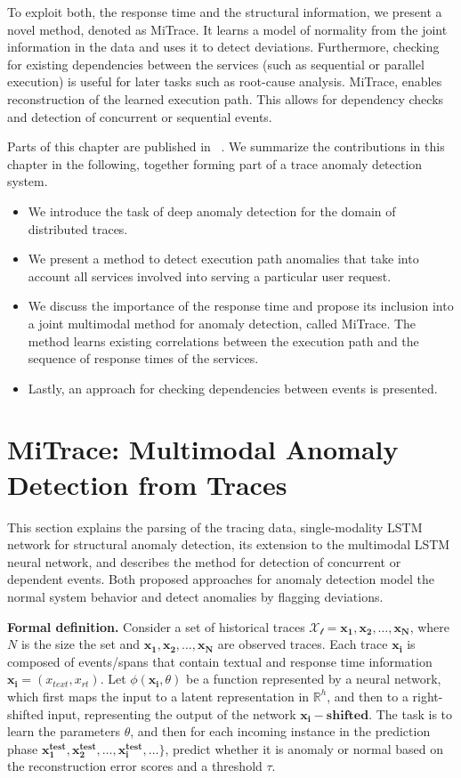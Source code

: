 To exploit both, the response time and the structural information, we present a novel method, denoted as MiTrace. It learns a model of normality from the joint information in the data and uses it to detect deviations. Furthermore, checking for existing dependencies between the services (such as sequential or parallel execution) is useful for later tasks such as root-cause analysis. MiTrace, enables reconstruction of the learned execution path. This allows for dependency checks and detection of concurrent or sequential events.


Parts of this chapter are published in ~\cite{nedelkoski2019anomalymultimodal,nedelkoski2020data,nedelkoski2019anomaly,nedelkoski2020selftracing}. We summarize the contributions in this chapter in the following, together forming part of a trace anomaly detection system. 
\begin{itemize}
    \item We introduce the task of deep anomaly detection for the domain of distributed traces.
    \item We present a method to detect execution path anomalies that take into account all services involved into serving a particular user request.
    \item We discuss the importance of the response time and propose its inclusion into a joint multimodal method for anomaly detection, called MiTrace. The method learns existing correlations between the execution path and the sequence of response times of the services. 
    \item Lastly, an approach for checking dependencies between events is presented.
\end{itemize}


\section{MiTrace: Multimodal Anomaly Detection from Traces}\label{methodology}
This section explains the parsing of the tracing data, single-modality LSTM network for structural anomaly detection, its extension to the multimodal LSTM neural network, and describes the method for detection of concurrent or dependent events. Both proposed approaches for anomaly detection model the normal system behavior and detect anomalies by flagging deviations.

\textbf{Formal definition.} Consider a set of historical traces $\mathcal{X_t} = \mathbf{x_{1}}, \mathbf{x_{2}}, \dots, \mathbf{x_{N}}$, where $N$ is the size the set and $\mathbf{x_{1}}, \mathbf{x_{2}}, \dots, \mathbf{x_{N}}$ are observed traces. Each trace $\mathbf{x_{i}}$ is composed of events/spans that contain textual and response time information $\mathbf{x_{i}}= (x_{text}, x_{rt})$. Let $\phi(\mathbf{x_i}, \theta)$ be a function represented by a neural network, which first maps the input to a latent representation in $\mathbb{R}^h$, and then to a right-shifted input, representing the output of the network $\mathbf{x_{i}-shifted}$. The task is to learn the parameters $\theta$, and then for each incoming instance in the prediction phase $\mathbf{x_1^{test}}, \mathbf{x_2^{test}},\dots, \mathbf{x_i^{test}}, \dots\}$, predict whether it is anomaly or normal based on the reconstruction error scores and a threshold $\tau$.

